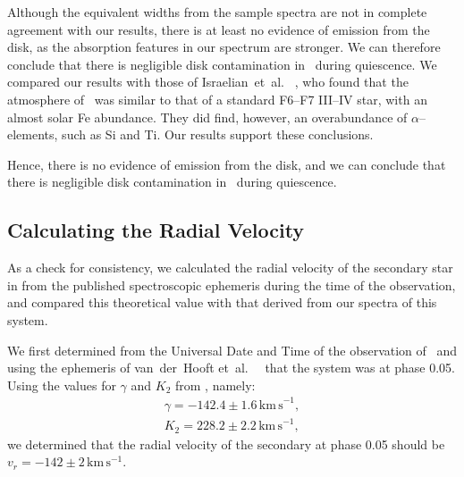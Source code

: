 \vspace{\myparskip}

Although the equivalent widths from the sample spectra are not in
complete agreement with our results, there is at least no evidence of
emission from the disk, as the absorption features in our spectrum are
stronger. We can therefore conclude that there is negligible disk
contamination in \groj\ during quiescence. We compared our results with those of Israelian~et~al.\ %
\citeyear{Israelian_et_al.:1999}%
, who found that the atmosphere of \groj\ was similar to that of a standard F6--F7 III--IV star, with an almost solar Fe abundance. They did find, however, an overabundance of $\alpha$--elements, such as Si and Ti. Our results support these conclusions. %

\vspace{\myparskip}

Hence, there is no evidence of emission from the disk, and we can conclude that there is negligible disk contamination in \groj\ during quiescence. %


\subsection{Calculating the Radial Velocity}
\label{cha:AccretionDiskContamination:sec:Spectroscopy:subsec:RadialVelocity}

As a check for consistency, we calculated the radial velocity of the
secondary star in \groj from the published spectroscopic ephemeris during the time of the observation, and compared
this theoretical value with that derived from our spectra of this
system. %

\vspace{\myparskip}

We first determined from the Universal Date and Time of
the observation of \groj\ and using the ephemeris of van~der~Hooft et~al.\ %
\citeyear{VanDerHooft_et_al.:1998}%
\ that the system was at phase 0.05. Using the values for $\gamma$ and
$K_2$ from %
%
, namely:
\begin{eqnarray}
\label{cha:AccretionDiskContamination:sec:Spectroscopy:subsec:RadialVelocity:eqn:values}
\gamma = -142.4\pm1.6\,\mathrm{km\,s}^{-1},\\
K_2 = 228.2\pm2.2\,\mathrm{km\,s}^{-1}, 
\end{eqnarray}
we determined that the radial velocity of the secondary at phase
0.05 should be $v_r = -142\pm2\,\mathrm{km}\,\mathrm{s}^{-1}$. %

